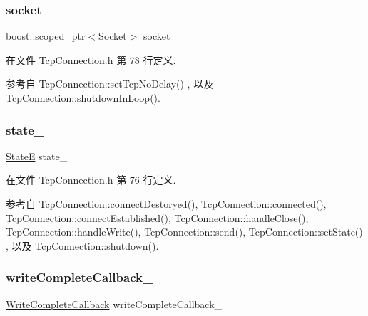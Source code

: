 \subsubsection{\texorpdfstring{socket\+\_\+}{socket\_}}
{\footnotesize\ttfamily boost\+::scoped\+\_\+ptr$<$\hyperlink{classmuduo_1_1Socket}{Socket}$>$ socket\+\_\+\hspace{0.3cm}{\ttfamily [private]}}



在文件 Tcp\+Connection.\+h 第 78 行定义.



参考自 Tcp\+Connection\+::set\+Tcp\+No\+Delay() , 以及 Tcp\+Connection\+::shutdown\+In\+Loop().

\mbox{\label{classmuduo_1_1TcpConnection_a4cfda1cf6d6cc44073a58722892cca7d}} 
\subsubsection{\texorpdfstring{state\+\_\+}{state\_}}
{\footnotesize\ttfamily \hyperlink{classmuduo_1_1TcpConnection_a8cf72f776f4277c8138a1beaf5185325}{StateE} state\+\_\+\hspace{0.3cm}{\ttfamily [private]}}



在文件 Tcp\+Connection.\+h 第 76 行定义.



参考自 Tcp\+Connection\+::connect\+Destoryed(), Tcp\+Connection\+::connected(), Tcp\+Connection\+::connect\+Established(), Tcp\+Connection\+::handle\+Close(), Tcp\+Connection\+::handle\+Write(), Tcp\+Connection\+::send(), Tcp\+Connection\+::set\+State() , 以及 Tcp\+Connection\+::shutdown().

\mbox{\label{classmuduo_1_1TcpConnection_a525f0d11cfa2e271600caa30407b6150}} 
\subsubsection{\texorpdfstring{write\+Complete\+Callback\+\_\+}{writeCompleteCallback\_}}
{\footnotesize\ttfamily \hyperlink{namespacemuduo_a605eda27d048a69607942b95735d7087}{Write\+Complete\+Callback} write\+Complete\+Callback\+\_\+\hspace{0.3cm}{\ttfamily [private]}}



